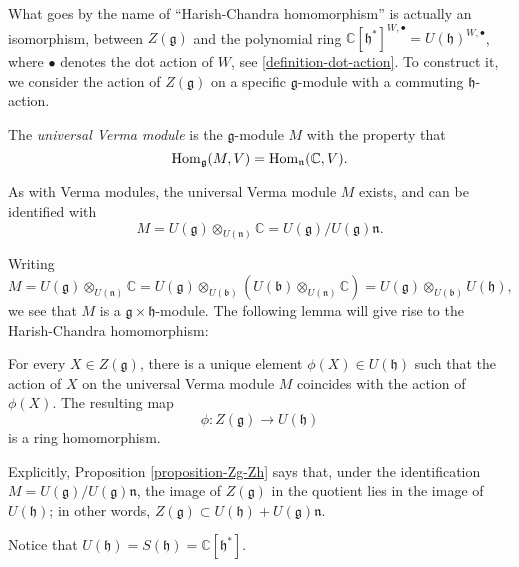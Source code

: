 What goes by the name of ``Harish-Chandra homomorphism'' is actually an isomorphism, between $Z(\mathfrak g)$ and the polynomial ring $\mathbb C[\mathfrak h^*]^{W,\bullet} = U(\mathfrak h)^{W,\bullet}$, where $\bullet$ denotes the dot action of $W$, see \ref{definition-dot-action}. To construct it, we consider the action of $Z(\mathfrak g)$ on a specific $\mathfrak g$-module with a commuting $\mathfrak h$-action. 


\begin{definition}
 \label{definition-universal-Verma-module}
The {\it universal Verma module} is the $\mathfrak g$-module $M$ with the property that
$$\mathop{\rm Hom}\nolimits_{\mathfrak g}(M, V) = \mathop{\rm Hom}\nolimits_{\mathfrak n} (\mathbb C,V).$$
\end{definition}

As with Verma modules, the universal Verma module $M$ exists, and can be identified with
$$ M= U(\mathfrak g)\otimes_{U(\mathfrak n)} \mathbb C = U(\mathfrak g)/U(\mathfrak g)\mathfrak n.$$

Writing 
$$M=U(\mathfrak g)\otimes_{U(\mathfrak n)} \mathbb C = U(\mathfrak g)\otimes_{U(\mathfrak b)}( U(\mathfrak b)\otimes_{U(\mathfrak n)} \mathbb C ) = U(\mathfrak g)\otimes_{U(\mathfrak b)} U(\mathfrak h),$$ 
we see that $M$ is a $\mathfrak g\times\mathfrak h$-module. The following lemma will give rise to the Harish-Chandra homomorphism:

\begin{proposition}
\label{proposition-Zg-Zh}
 For every $X\in Z(\mathfrak g)$, there is a unique element $\phi(X)\in U(\mathfrak h) $ such that the action of $X$ on the universal Verma module $M$ coincides with the action of $\phi(X)$. The resulting map 
 $$ \phi: Z(\mathfrak g)\to U(\mathfrak h)$$
 is a ring homomorphism.
\end{proposition}

\begin{remark}
 \label{remark-Zg-Zh-explicit}
Explicitly, Proposition \ref{proposition-Zg-Zh} says that, under the identification $M= U(\mathfrak g)/U(\mathfrak g)\mathfrak n$, the image of $Z(\mathfrak g)$ in the quotient lies in the image of $U(\mathfrak h)$; in other words, $Z(\mathfrak g)\subset U(\mathfrak h) + U(\mathfrak g)\mathfrak n$. 
\end{remark}


Notice that $U(\mathfrak h) = S(\mathfrak h) = \mathbb C[\mathfrak h^*]$. 

